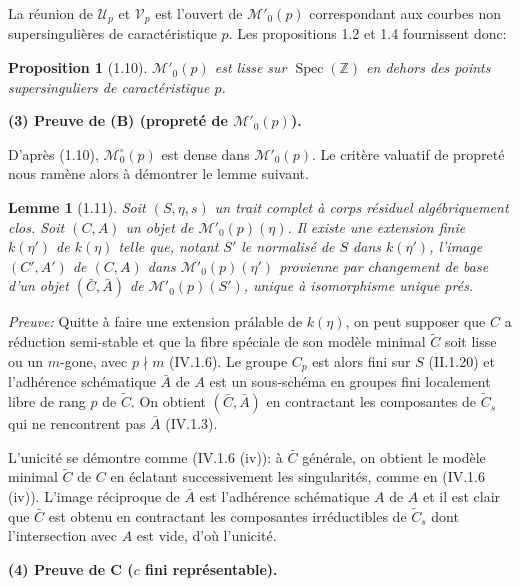 \documentclass[11pt,a4paper]{amsart}
\theoremstyle{plain}
\newtheorem{lemma}[theorem]{Lemme}
\newtheorem{proposition}[theorem]{Proposition}
\theoremstyle{definition}
\DeclareMathOperator{\Spec}{Spec}
\newcommand{\CU}{\mathcal{U}}
\newcommand{\CV}{\mathcal{V}}
\newcommand{\mll}{\mathcal{M}}
\newcommand{\ZZ}{\mathbb{Z}}
\begin{document}
La r\'eunion de $\CU_p$ et $\CV_p$ est l'ouvert de $\mll'_0(p)$ correspondant aux courbes non supersinguli\`eres de caract\'eristique $p$. Les propositions 1.2 et 1.4 fournissent donc:

\begin{proposition}[1.10]
$\mll'_0(p)$ est lisse sur $\Spec(\ZZ)$ en dehors des points supersinguliers de caract\'eristique $p$.
\end{proposition}

\medskip

\noindent\textbf{(3) Preuve de (B) (propret\'e de $\mll'_0(p)$).}

D'apr\`es (1.10), $\mll^{\circ}_0(p)$ est dense dans $\mll'_0(p)$. Le crit\`ere valuatif de propret\'e nous ram\`ene alors \`a d\'emontrer le lemme suivant.

\begin{lemma}[1.11]
Soit $(S, \eta, s)$ un trait complet \`a corps r\'esiduel alg\'ebriquement clos. Soit $(C,A)$ un objet de $\mll'_0(p)(\eta)$. Il existe une extension finie $k(\eta')$ de $k(\eta)$ telle que, notant $S'$ le normalis\'e de $S$ dans $k(\eta')$, l'image $(C',A')$ de $(C,A)$ dans $\mll'_0(p)(\eta')$ provienne par changement de base d'un objet $(\bar{C}, \bar{A})$ de $\mll'_0(p)(S')$, unique \`a isomorphisme unique pr\'es.
\end{lemma}

\noindent\textit{Preuve:} Quitte \`a faire une extension pr\'alable de $k(\eta)$, on peut supposer que $C$ a r\'eduction semi-stable et que la fibre sp\'eciale de son mod\`ele minimal $\tilde{C}$ soit lisse ou un $m$-gone, avec $p \nmid m$ (IV.1.6). Le groupe $C_p$ est alors fini sur $S$ (II.1.20) et l'adh\'erence sch\'ematique $\bar{A}$ de $A$ est un sous-sch\'ema en groupes fini localement libre de rang $p$ de $\tilde{C}$. On obtient $(\bar{C}, \bar{A})$ en contractant les composantes de $\tilde{C}_s$ qui ne rencontrent pas $\bar{A}$ (IV.1.3).

L'unicit\'e se d\'emontre comme (IV.1.6 (iv)): \`a $\bar{C}$ g\'en\'erale, on obtient le mod\`ele minimal $\tilde{C}$ de $C$ en \'eclatant successivement les singularit\'es, comme en (IV.1.6 (iv)). L'image r\'eciproque de $\bar{A}$ est l'adh\'erence sch\'ematique $A$ de $A$ et il est clair que $\bar{C}$ est obtenu en contractant les composantes irr\'eductibles de $\tilde{C}_s$ dont l'intersection avec $A$ est vide, d'o\`u l'unicit\'e.

\medskip

\noindent\textbf{(4) Preuve de C ($c$ fini repr\'esentable).}
\end{document}
